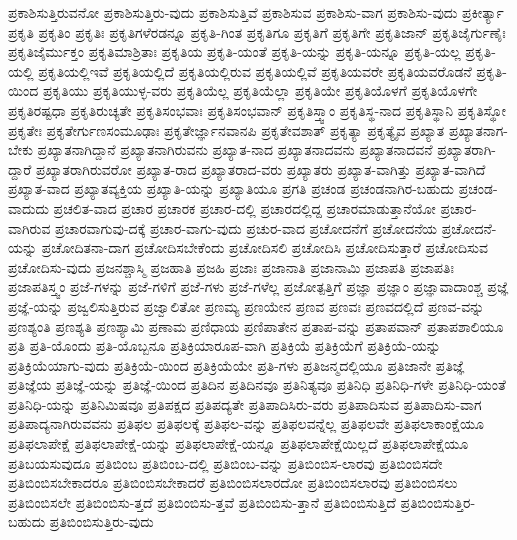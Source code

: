 {ಪ್ರಕಾಶಿಸುತ್ತಿರುವನೋ
ಪ್ರಕಾಶಿಸುತ್ತಿರು-ವುದು
ಪ್ರಕಾಶಿಸುತ್ತಿವೆ
ಪ್ರಕಾಶಿಸುವ
ಪ್ರಕಾಶಿಸು-ವಾಗ
ಪ್ರಕಾಶಿಸು-ವುದು
ಪ್ರಕೀರ್ತ್ಯಾ
ಪ್ರಕೃತಿ
ಪ್ರಕೃತಿಂ
ಪ್ರಕೃತಿಃ
ಪ್ರಕೃತಿಗಳೆರಡನ್ನೂ
ಪ್ರಕೃತಿ-ಗಿಂತ
ಪ್ರಕೃತಿಗೂ
ಪ್ರಕೃತಿಗೆ
ಪ್ರಕೃತಿಗೇ
ಪ್ರಕೃತಿಜಾನ್
ಪ್ರಕೃತಿಜೈರ್ಗುಣೈಃ
ಪ್ರಕೃತಿಜೈರ್ಮುಕ್ತಂ
ಪ್ರಕೃತಿಮಾಶ್ರಿತಾಃ
ಪ್ರಕೃತಿಯ
ಪ್ರಕೃತಿ-ಯಂತೆ
ಪ್ರಕೃತಿ-ಯನ್ನು
ಪ್ರಕೃತಿ-ಯನ್ನೂ
ಪ್ರಕೃತಿ-ಯಲ್ಲ
ಪ್ರಕೃತಿ-ಯಲ್ಲಿ
ಪ್ರಕೃತಿಯಲ್ಲಿಇವೆ
ಪ್ರಕೃತಿಯಲ್ಲಿದೆ
ಪ್ರಕೃತಿಯಲ್ಲಿರುವ
ಪ್ರಕೃತಿಯಲ್ಲಿವೆ
ಪ್ರಕೃತಿಯವರೇ
ಪ್ರಕೃತಿಯವರೊಡನೆ
ಪ್ರಕೃತಿ-ಯಿಂದ
ಪ್ರಕೃತಿಯು
ಪ್ರಕೃತಿಯುಳ್ಳ-ವರು
ಪ್ರಕೃತಿಯೆಲ್ಲ
ಪ್ರಕೃತಿಯೆಲ್ಲಾ
ಪ್ರಕೃತಿಯೇ
ಪ್ರಕೃತಿಯೊಳಗೆ
ಪ್ರಕೃತಿಯೊಳಗೇ
ಪ್ರಕೃತಿರಷ್ಟಧಾ
ಪ್ರಕೃತಿರುಚ್ಯತೇ
ಪ್ರಕೃತಿಸಂಭವಾಃ
ಪ್ರಕೃತಿಸಂಭವಾನ್
ಪ್ರಕೃತಿಸ್ತ್ವಾಂ
ಪ್ರಕೃತಿಸ್ಥ-ನಾದ
ಪ್ರಕೃತಿಸ್ಥಾನಿ
ಪ್ರಕೃತಿಸ್ಥೋ
ಪ್ರಕೃತೇಃ
ಪ್ರಕೃತೇರ್ಗುಣಸಂಮೂಢಾಃ
ಪ್ರಕೃತೇರ್ಜ್ಞಾನವಾನಪಿ
ಪ್ರಕೃತೇವಶಾತ್
ಪ್ರಕೃತ್ಯಾ
ಪ್ರಕೃತ್ಯೈವ
ಪ್ರಖ್ಯಾತ
ಪ್ರಖ್ಯಾತನಾಗ-ಬೇಕು
ಪ್ರಖ್ಯಾತನಾಗಿದ್ದಾನೆ
ಪ್ರಖ್ಯಾತನಾಗಿರುವನು
ಪ್ರಖ್ಯಾತ-ನಾದ
ಪ್ರಖ್ಯಾತನಾದವನು
ಪ್ರಖ್ಯಾತನಾದವನೆ
ಪ್ರಖ್ಯಾತರಾಗಿ-ದ್ದಾರೆ
ಪ್ರಖ್ಯಾತರಾಗಿರುವರೋ
ಪ್ರಖ್ಯಾತ-ರಾದ
ಪ್ರಖ್ಯಾತರಾದ-ವರು
ಪ್ರಖ್ಯಾತರು
ಪ್ರಖ್ಯಾತ-ವಾಗಿತ್ತು
ಪ್ರಖ್ಯಾತ-ವಾಗಿದೆ
ಪ್ರಖ್ಯಾತ-ವಾದ
ಪ್ರಖ್ಯಾತವ್ಯಕ್ತಿಯ
ಪ್ರಖ್ಯಾತಿ-ಯನ್ನು
ಪ್ರಖ್ಯಾತಿಯೂ
ಪ್ರಗತಿ
ಪ್ರಚಂಡ
ಪ್ರಚಂಡನಾಗಿರ-ಬಹುದು
ಪ್ರಚಂಡ-ವಾದುದು
ಪ್ರಚಲಿತ-ವಾದ
ಪ್ರಚಾರ
ಪ್ರಚಾರಕ
ಪ್ರಚಾರ-ದಲ್ಲಿ
ಪ್ರಚಾರದಲ್ಲಿದ್ದ
ಪ್ರಚಾರಮಾಡುತ್ತಾನೆಯೋ
ಪ್ರಚಾರ-ವಾಗಿರುವ
ಪ್ರಚಾರವಾಗುವು-ದಕ್ಕೆ
ಪ್ರಚಾರ-ವಾಗು-ವುದು
ಪ್ರಚುರ-ವಾದ
ಪ್ರಚೋದನೆಗೆ
ಪ್ರಚೋದನೆಯ
ಪ್ರಚೋದನೆ-ಯನ್ನು
ಪ್ರಚೋದಿತನಾ-ದಾಗ
ಪ್ರಚೋದಿಸಬೇಕೆಂದು
ಪ್ರಚೋದಿಸಲಿ
ಪ್ರಚೋದಿಸಿ
ಪ್ರಚೋದಿಸುತ್ತಾರೆ
ಪ್ರಚೋದಿಸುವ
ಪ್ರಚೋದಿಸು-ವುದು
ಪ್ರಜನಶ್ಚಾಸ್ಮಿ
ಪ್ರಜಹಾತಿ
ಪ್ರಜಹಿ
ಪ್ರಜಾಃ
ಪ್ರಜಾನಾತಿ
ಪ್ರಜಾನಾಮಿ
ಪ್ರಜಾಪತಿ
ಪ್ರಜಾಪತಿಃ
ಪ್ರಜಾಪತಿಸ್ತ್ವಂ
ಪ್ರಜೆ-ಗಳನ್ನು
ಪ್ರಜೆ-ಗಳಿಗೆ
ಪ್ರಜೆ-ಗಳು
ಪ್ರಜೆ-ಗಳೆಲ್ಲ
ಪ್ರಜೋತ್ಪತ್ತಿಗೆ
ಪ್ರಜ್ಞಾ
ಪ್ರಜ್ಞಾಂ
ಪ್ರಜ್ಞಾವಾದಾಂಶ್ಚ
ಪ್ರಜ್ಞೆ
ಪ್ರಜ್ಞೆ-ಯನ್ನು
ಪ್ರಜ್ವಲಿಸುತ್ತಿರುವ
ಪ್ರಜ್ವಾಲಿತೋ
ಪ್ರಣಮ್ಯ
ಪ್ರಣಯೇನ
ಪ್ರಣವ
ಪ್ರಣವಃ
ಪ್ರಣವದಲ್ಲಿದೆ
ಪ್ರಣವ-ವನ್ನು
ಪ್ರಣಶ್ಯಂತಿ
ಪ್ರಣಶ್ಯತಿ
ಪ್ರಣಶ್ಯಾಮಿ
ಪ್ರಣಾಮ
ಪ್ರಣಿಧಾಯ
ಪ್ರಣಿಪಾತೇನ
ಪ್ರತಾಪ-ವನ್ನು
ಪ್ರತಾಪವಾನ್
ಪ್ರತಾಪಶಾಲಿಯೂ
ಪ್ರತಿ
ಪ್ರತಿ-ಯೊಂದು
ಪ್ರತಿ-ಯೊಬ್ಬನೂ
ಪ್ರತಿಕ್ರಿಯಾರೂಪ-ವಾಗಿ
ಪ್ರತಿಕ್ರಿಯೆ
ಪ್ರತಿಕ್ರಿಯೆಗೆ
ಪ್ರತಿಕ್ರಿಯೆ-ಯನ್ನು
ಪ್ರತಿಕ್ರಿಯೆಯಾಗು-ವುದು
ಪ್ರತಿಕ್ರಿಯೆ-ಯಿಂದ
ಪ್ರತಿಕ್ರಿಯೆಯೇ
ಪ್ರತಿ-ಗಳು
ಪ್ರತಿಜನ್ಮದಲ್ಲಿಯೂ
ಪ್ರತಿಜಾನೇ
ಪ್ರತಿಜ್ಞೆ
ಪ್ರತಿಜ್ಞೆಯ
ಪ್ರತಿಜ್ಞೆ-ಯನ್ನು
ಪ್ರತಿಜ್ಞೆ-ಯಿಂದ
ಪ್ರತಿದಿನ
ಪ್ರತಿದಿನವೂ
ಪ್ರತಿನಿತ್ಯವೂ
ಪ್ರತಿನಿಧಿ
ಪ್ರತಿನಿಧಿ-ಗಳೇ
ಪ್ರತಿನಿಧಿ-ಯಂತೆ
ಪ್ರತಿನಿಧಿ-ಯನ್ನು
ಪ್ರತಿನಿಮಿಷವೂ
ಪ್ರತಿಪಕ್ಷದ
ಪ್ರತಿಪದ್ಯತೇ
ಪ್ರತಿಪಾದಿಸಿರು-ವರು
ಪ್ರತಿಪಾದಿಸುವ
ಪ್ರತಿಪಾದಿಸು-ವಾಗ
ಪ್ರತಿಪಾದ್ಯನಾಗಿರುವವನು
ಪ್ರತಿಫಲ
ಪ್ರತಿಫಲಕ್ಕೆ
ಪ್ರತಿಫಲ-ವನ್ನು
ಪ್ರತಿಫಲವನ್ನೆಲ್ಲ
ಪ್ರತಿಫಲವೇ
ಪ್ರತಿಫಲಾಕಾಂಕ್ಷೆಯೂ
ಪ್ರತಿಫಲಾಪೇಕ್ಷೆ
ಪ್ರತಿಫಲಾಪೇಕ್ಷೆ-ಯನ್ನು
ಪ್ರತಿಫಲಾಪೇಕ್ಷೆ-ಯನ್ನೂ
ಪ್ರತಿಫಲಾಪೇಕ್ಷೆಯಿಲ್ಲದೆ
ಪ್ರತಿಫಲಾಪೇಕ್ಷೆಯೂ
ಪ್ರತಿಬಯಸುವುದೂ
ಪ್ರತಿಬಿಂಬ
ಪ್ರತಿಬಿಂಬ-ದಲ್ಲಿ
ಪ್ರತಿಬಿಂಬ-ವನ್ನು
ಪ್ರತಿಬಿಂಬಿಸ-ಲಾರವು
ಪ್ರತಿಬಿಂಬಿಸದೇ
ಪ್ರತಿಬಿಂಬಿಸಬೇಕಾದರೂ
ಪ್ರತಿಬಿಂಬಿಸಬೇಕಾದರೆ
ಪ್ರತಿಬಿಂಬಿಸಲಾರದೋ
ಪ್ರತಿಬಿಂಬಿಸಲಾರವು
ಪ್ರತಿಬಿಂಬಿಸಲು
ಪ್ರತಿಬಿಂಬಿಸಲೇ
ಪ್ರತಿಬಿಂಬಿಸು-ತ್ತದೆ
ಪ್ರತಿಬಿಂಬಿಸು-ತ್ತವೆ
ಪ್ರತಿಬಿಂಬಿಸು-ತ್ತಾನೆ
ಪ್ರತಿಬಿಂಬಿಸುತ್ತಿದೆ
ಪ್ರತಿಬಿಂಬಿಸುತ್ತಿರ-ಬಹುದು
ಪ್ರತಿಬಿಂಬಿಸುತ್ತಿರು-ವುದು
}
